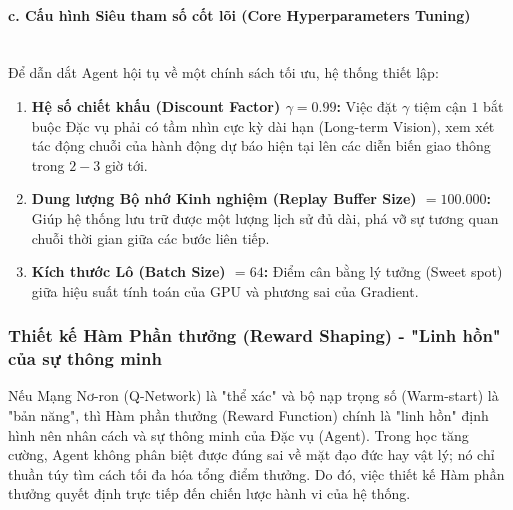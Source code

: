 \paragraph{c. Cấu hình Siêu tham số cốt lõi (Core Hyperparameters Tuning)} \mbox{} \\
Để dẫn dắt Agent hội tụ về một chính sách tối ưu, hệ thống thiết lập:
\begin{enumerate}
    \item \textbf{Hệ số chiết khấu (Discount Factor) $\gamma = 0.99$:} Việc đặt $\gamma$ tiệm cận $1$ bắt buộc Đặc vụ phải có tầm nhìn cực kỳ dài hạn (Long-term Vision), xem xét tác động chuỗi của hành động dự báo hiện tại lên các diễn biến giao thông trong $2-3$ giờ tới.
    \item \textbf{Dung lượng Bộ nhớ Kinh nghiệm (Replay Buffer Size) $= 100.000$:} Giúp hệ thống lưu trữ được một lượng lịch sử đủ dài, phá vỡ sự tương quan chuỗi thời gian giữa các bước liên tiếp.
    \item \textbf{Kích thước Lô (Batch Size) $= 64$:} Điểm cân bằng lý tưởng (Sweet spot) giữa hiệu suất tính toán của GPU và phương sai của Gradient.
\end{enumerate}

\subsubsection{Thiết kế Hàm Phần thưởng (Reward Shaping) - "Linh hồn" của sự thông minh}

Nếu Mạng Nơ-ron (Q-Network) là "thể xác" và bộ nạp trọng số (Warm-start) là "bản năng", thì Hàm phần thưởng (Reward Function) chính là "linh hồn" định hình nên nhân cách và sự thông minh của Đặc vụ (Agent). Trong học tăng cường, Agent không phân biệt được đúng sai về mặt đạo đức hay vật lý; nó chỉ thuần túy tìm cách tối đa hóa tổng điểm thưởng. Do đó, việc thiết kế Hàm phần thưởng quyết định trực tiếp đến chiến lược hành vi của hệ thống.

